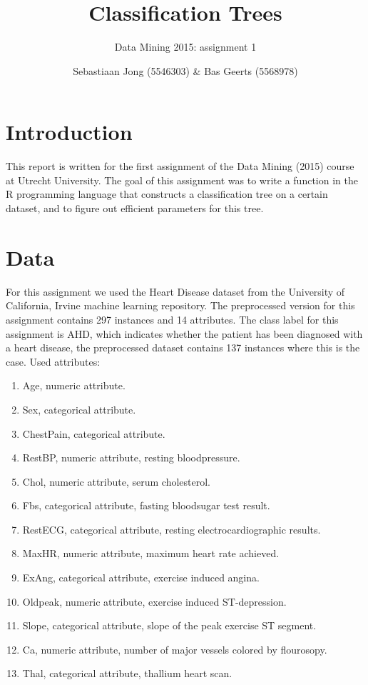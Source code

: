 \documentclass[a4paper,12pt]{scrartcl}
\def\labelitemi{--}
\begin{document}
\title{Classification Trees}
\subtitle{Data Mining 2015: assignment 1}
\author{Sebastiaan Jong (5546303) \& Bas Geerts (5568978)}
\date{}
\maketitle
\section{Introduction}
This report is written for the first assignment of the Data Mining (2015) course at Utrecht University. The goal of this assignment was to write a function in the R programming language that constructs a classification tree on a certain dataset, and to figure out efficient parameters for this tree.
\section{Data}
For this assignment we used the Heart Disease dataset from the University of California, Irvine machine learning repository. The preprocessed version for this assignment contains 297 instances and 14 attributes. The class label for this assignment is AHD, which indicates whether the patient has been diagnosed with a heart disease, the preprocessed dataset contains 137 instances where this is the case. Used attributes:
    \begin{enumerate} \itemsep0pt
        \renewcommand\labelitemi{--}
        \item Age, numeric attribute.
        \item Sex, categorical attribute.
        \item ChestPain, categorical attribute.
        \item RestBP, numeric attribute, resting bloodpressure.
        \item Chol, numeric attribute, serum cholesterol.
        \item Fbs, categorical attribute, fasting bloodsugar test result. 
        \item RestECG, categorical attribute, resting electrocardiographic results.
        \item MaxHR, numeric attribute, maximum heart rate achieved.
        \item ExAng, categorical attribute, exercise induced angina. 
        \item Oldpeak, numeric attribute, exercise induced ST-depression. 
        \item Slope, categorical attribute, slope of the peak exercise ST segment.
        \item Ca, numeric attribute, number of major vessels colored by flourosopy.
        \item Thal, categorical attribute, thallium heart scan.
    \end{enumerate}
\clearpage
\end{document}
